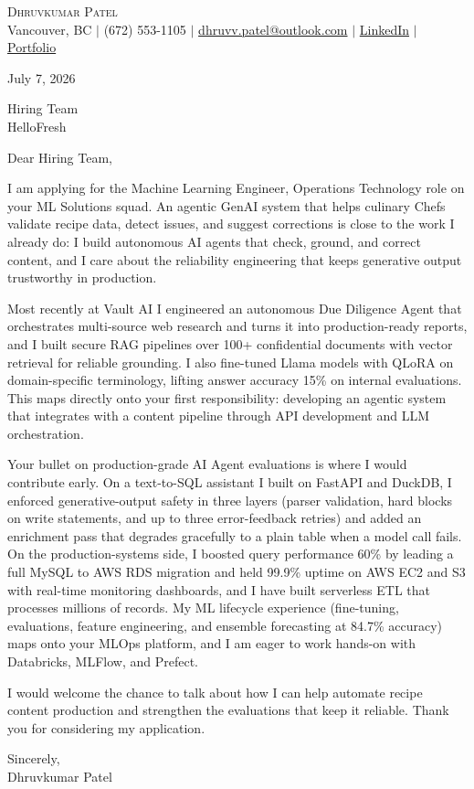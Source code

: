 \documentclass[letterpaper,11pt]{article}
\begin{document}
\begin{center}
    {\Large \scshape Dhruvkumar Patel}\\[2pt]
    \small Vancouver, BC $|$ (672) 553-1105 $|$ \href{mailto:dhruvv.patel@outlook.com}{dhruvv.patel@outlook.com} $|$
    \href{https://www.linkedin.com/in/dhruvkumarpatell/}{LinkedIn} $|$ \href{https://dhruvvkumarpatel.vercel.app/}{Portfolio}
\end{center}

\vspace{8pt}
July 7, 2026

\vspace{4pt}
Hiring Team\\
HelloFresh

\vspace{8pt}
Dear Hiring Team,

I am applying for the Machine Learning Engineer, Operations Technology role on your ML Solutions squad. An agentic GenAI system that helps culinary Chefs validate recipe data, detect issues, and suggest corrections is close to the work I already do: I build autonomous AI agents that check, ground, and correct content, and I care about the reliability engineering that keeps generative output trustworthy in production.

Most recently at Vault AI I engineered an autonomous Due Diligence Agent that orchestrates multi-source web research and turns it into production-ready reports, and I built secure RAG pipelines over 100+ confidential documents with vector retrieval for reliable grounding. I also fine-tuned Llama models with QLoRA on domain-specific terminology, lifting answer accuracy 15\% on internal evaluations. This maps directly onto your first responsibility: developing an agentic system that integrates with a content pipeline through API development and LLM orchestration.

Your bullet on production-grade AI Agent evaluations is where I would contribute early. On a text-to-SQL assistant I built on FastAPI and DuckDB, I enforced generative-output safety in three layers (parser validation, hard blocks on write statements, and up to three error-feedback retries) and added an enrichment pass that degrades gracefully to a plain table when a model call fails. On the production-systems side, I boosted query performance 60\% by leading a full MySQL to AWS RDS migration and held 99.9\% uptime on AWS EC2 and S3 with real-time monitoring dashboards, and I have built serverless ETL that processes millions of records. My ML lifecycle experience (fine-tuning, evaluations, feature engineering, and ensemble forecasting at 84.7\% accuracy) maps onto your MLOps platform, and I am eager to work hands-on with Databricks, MLFlow, and Prefect.

I would welcome the chance to talk about how I can help automate recipe content production and strengthen the evaluations that keep it reliable. Thank you for considering my application.

\vspace{8pt}
Sincerely,\\
Dhruvkumar Patel
\end{document}
